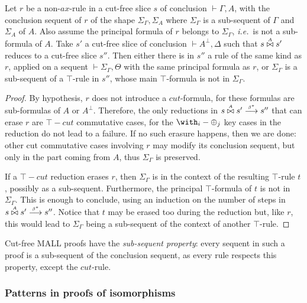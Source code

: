 \documentclass{lmcs}
\newcommand*{\orth}{^\perp} %
\renewcommand*{\fCenter}{\vdash} %
\newcommand*{\ie}{\emph{i.e.}}
\newcommand{\symboltext}[2]{\mathrel{\overset{\makebox[0pt]{\mbox{\normalfont\tiny\sffamily \ensuremath{#1}}}}{#2}}} %
\newcommand{\betatostar}{\symboltext{\beta^*}{\longrightarrow}}
\newcommand*{\cutf}[3]{\ensuremath{#1\symboltext{#3}{\bowtie} #2}}
\begin{document}
\begin{lem}
\label{lem:top_eat_visible}
Let $r$ be a non-$ax$-rule in a cut-free slice $s$ of conclusion $\fCenter \Gamma, A$, with the conclusion sequent of $r$ of the shape $\Sigma_\Gamma,\Sigma_A$ where $\Sigma_\Gamma$ is a sub-sequent of $\Gamma$ and $\Sigma_A$ of $A$.
Also assume the principal formula of $r$ belongs to $\Sigma_\Gamma$, \ie\ is not a sub-formula of $A$.
Take $s'$ a cut-free slice of conclusion $\fCenter A\orth, \Delta$ such that $\cutf{s}{s'}{A}$ reduces to a cut-free slice $s''$.
Then either there is in $s''$ a rule of the same kind as $r$, applied on a sequent $\fCenter \Sigma_\Gamma,\Theta$ with the same principal formula as $r$, or $\Sigma_\Gamma$ is a sub-sequent of a $\top$-rule in $s''$, whose main $\top$-formula is not in $\Sigma_\Gamma$.
\end{lem}
\begin{proof}
By hypothesis, $r$ does not introduce a $cut$-formula, for these formulas are sub-formulas of $A$ or $A\orth$.
Therefore, the only reductions in $\cutf{s}{s'}{A}\betatostar s''$ that can erase $r$ are $\top-cut$ commutative cases, for the $\with_i-\oplus_j$ key cases in the reduction do not lead to a failure.
If no such erasure happens, then we are done: other cut commutative cases involving $r$ may modify its conclusion sequent, but only in the part coming from $A$, thus $\Sigma_\Gamma$ is preserved.

If a $\top-cut$ reduction erases $r$, then $\Sigma_\Gamma$ is in the context of the resulting $\top$-rule $t$, possibly as a sub-sequent.
Furthermore, the principal $\top$-formula of $t$ is not in $\Sigma_\Gamma$.
This is enough to conclude, using an induction on the number of steps in $\cutf{s}{s'}{A}\betatostar s''$.
Notice that $t$ may be erased too during the reduction but, like $r$, this would lead to $\Sigma_\Gamma$ being a sub-sequent of the context of another $\top$-rule.
\end{proof}

\begin{rem}
\label{rem:sub-sequent_property}
Cut-free MALL proofs have the \emph{sub-sequent property}: every sequent in such a proof is a sub-sequent of the conclusion sequent, as every rule respects this property, except the $cut$-rule.
\end{rem}

\subsubsection{Patterns in proofs of isomorphisms}
\label{sec:pattern_dist_seqisos_proofs}
\end{document}
